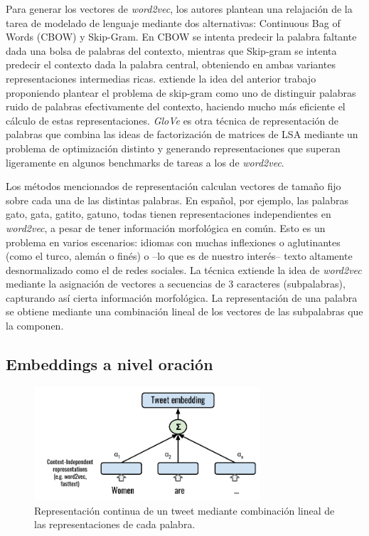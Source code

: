 Para generar los vectores de \emph{word2vec}, los autores plantean una relajación de la tarea de modelado de lenguaje mediante dos alternativas: Continuous Bag of Words (CBOW) y Skip-Gram. En CBOW se intenta predecir la palabra faltante dada una bolsa de palabras del contexto, mientras que Skip-gram se intenta predecir el contexto dada la palabra central, obteniendo en ambas variantes representaciones intermedias ricas. \citet{mikolov2013efficient} extiende la idea del anterior trabajo proponiendo plantear el problema de skip-gram como uno de distinguir palabras ruido de palabras efectivamente del contexto, haciendo mucho más eficiente el cálculo de estas representaciones. \emph{GloVe} \cite{pennington2014glove} es otra técnica de representación de palabras que combina las ideas de factorización de matrices de LSA  mediante un problema de optimización distinto y generando representaciones que superan ligeramente en algunos benchmarks de tareas a los de \emph{word2vec}.

Los métodos mencionados de representación calculan vectores de tamaño fijo sobre cada una de las distintas palabras. En español, por ejemplo, las palabras gato, gata, gatito, gatuno, todas tienen representaciones independientes en \emph{word2vec}, a pesar de tener información morfológica en común. Esto es un problema en varios escenarios: idiomas con muchas inflexiones o aglutinantes (como el turco, alemán o finés) o --lo que es de nuestro interés-- texto altamente desnormalizado como el de redes sociales. La técnica \fasttext{} \cite{bojanowski16} extiende la idea de \emph{word2vec} mediante la asignación de vectores a secuencias de 3 caracteres (subpalabras), capturando así cierta información morfológica. La representación de una palabra se obtiene mediante una combinación lineal de los vectores de las subpalabras que la componen.

\subsection{Embeddings a nivel oración}
\label{sec:02_tweet_embeddings}


\begin{figure}[t]
    \centering
    \includegraphics[width=0.75\textwidth]{img/tweet_embeddings.pdf}
    \caption{Representación continua de un tweet mediante combinación lineal de las representaciones de cada palabra.}
    \label{fig:tweet_embeddings}
\end{figure}

